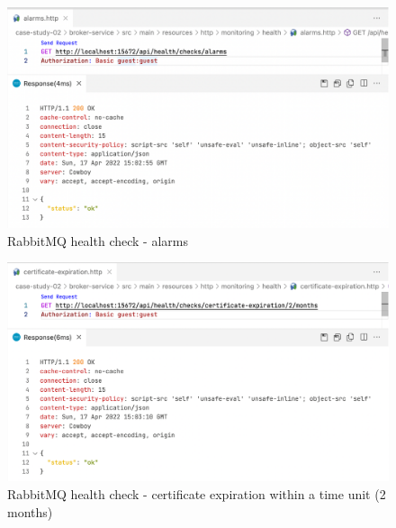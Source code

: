 \begin{figure}[H]
	\centering
	\includegraphics[width=1.0\linewidth]{./assets/images/case-studies/cs02-hc1.png}
	\caption{RabbitMQ health check - alarms}
	\label{fig:cs02-hc1}
\end{figure}

\begin{figure}[H]
	\centering
	\includegraphics[width=1.0\linewidth]{./assets/images/case-studies/cs02-hc3.png}
	\caption{RabbitMQ health check - certificate expiration within a time unit (2 months)}
	\label{fig:cs02-hc3}
\end{figure}

